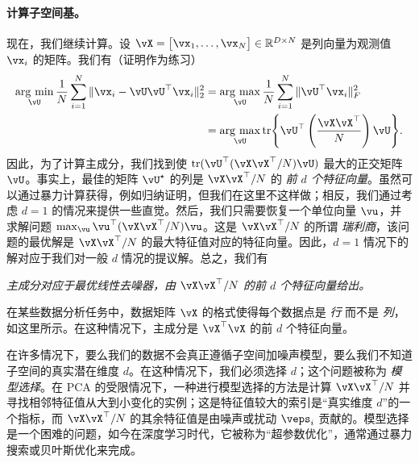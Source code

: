 \documentclass[../../book-main.tex]{subfiles}
\begin{document}
\paragraph{计算子空间基。}
现在，我们继续计算。设 \(\vX = \mat{\vx_{1}, \dots, \vx_{N}} \in \R^{D \times N}\) 是列向量为观测值 \(\vx_{i}\) 的矩阵。我们有（证明作为练习）
\begin{align}
    \argmin_{\vU}\frac{1}{N}\sum_{i = 1}^{N}\norm{\vx_{i} - \vU\vU^{\top}\vx_{i}}_{2}^{2}
    &= \argmax_{\vU}\frac{1}{N}\sum_{i = 1}^{N}\norm{\vU^{\top}\vx_{i}}_{F}^{2} \\ 
    &= \argmax_{\vU}\tr\rc{\vU^{\top}\bp{\frac{\vX\vX^{\top}}{N}}\vU}.
\end{align}
因此，为了计算主成分，我们找到使 \(\tr(\vU^{\top}(\vX\vX^{\top}/N)\vU)\) 最大的正交矩阵 \(\vU\)。事实上，最佳的矩阵 \(\vU^{\star}\) 的列是 \(\vX\vX^{\top}/N\) 的 \textit{前 \(d\) 个特征向量}。虽然可以通过暴力计算获得，例如归纳证明，但我们在这里不这样做；相反，我们通过考虑 \(d = 1\) 的情况来提供一些直觉。然后，我们只需要恢复一个单位向量 \(\vu\)，并求解问题 \(\max_{\vu} \vu^{\top}(\vX\vX^{\top}/N)\vu\)。这是 \(\vX\vX^{\top}/N\) 的所谓 \textit{瑞利商}，该问题的最优解是 \(\vX\vX^{\top}/N\) 的最大特征值对应的特征向量。因此，\(d = 1\) 情况下的解对应于我们对一般 \(d\) 情况的提议解。总之，我们有
\begin{tcolorbox}
    \textit{主成分对应于最优线性去噪器，由 \(\vX\vX^{\top}/N\) 的前 \(d\) 个特征向量给出。}
\end{tcolorbox}

\begin{remark}
    在某些数据分析任务中，数据矩阵 \(\vX\) 的格式使得每个数据点是 \textit{行} 而不是 \textit{列}，如这里所示。在这种情况下，主成分是 \(\vX^{\top}\vX\) 的前 \(d\) 个特征向量。
\end{remark}

\begin{remark}
    在许多情况下，要么我们的数据不会真正遵循子空间加噪声模型，要么我们不知道子空间的真实潜在维度 \(d\)。在这种情况下，我们必须选择 \(d\)；这个问题被称为 \textit{模型选择}。在 PCA 的受限情况下，一种进行模型选择的方法是计算 \(\vX\vX^{\top}/N\) 并寻找相邻特征值从大到小变化的实例；这是特征值较大的索引是“真实维度 \(d\)”的一个指标，而 \(\vX\vX^{\top}/N\) 的其余特征值是由噪声或扰动 \(\veps_{i}\) 贡献的。模型选择是一个困难的问题，如今在深度学习时代，它被称为“超参数优化”，通常通过暴力搜索或贝叶斯优化来完成。%
\end{remark}
\end{document}
